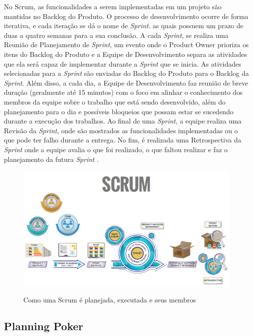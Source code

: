 No Scrum, as funcionalidades a serem implementadas em um projeto são mantidas no Backlog do Produto. O processo de desenvolvimento ocorre de forma iterativa, e cada iteração se dá o nome de \textit{Sprint}. as quais possuem um prazo de duas a quatro semanas para a sua conclusão. A cada \textit{Sprint}, se realiza uma Reunião de Planejamento de \textit{Sprint}, um evento onde o Product Owner prioriza os itens do Backlog do Produto e a Equipe de Desenvolvimento separa as atividades que ela será capaz de implementar durante a \textit{Sprint} que se inicia. As atividades selecionadas para a \textit{Sprint} são enviadas do Backlog do Produto para o Backlog da \textit{Sprint}. Além disso, a cada dia, a Equipe de Desenvolvimento faz reunião de breve duração (geralmente até 15 minutos) com o foco em alinhar o conhecimento dos membros da equipe sobre o trabalho que está sendo desenvolvido, além do planejamento para o dia e possíveis bloqueios que possam estar se sucedendo durante a execução dos trabalhos. Ao final de uma \textit{Sprint}, a equipe realiza uma Revisão da \textit{Sprint}, onde são mostrados as funcionalidades implementadas ou o que pode ter falho durante a entrega. No fim, é realizada uma Retrospectiva da \textit{Sprint} onde a equipe avalia o que foi realizado, o que faltou realizar e faz o planejamento da futura \textit{Sprint} \cite{Scrum}.

\begin{figure}
    \centering
    \includegraphics{img/Imagem Scrum Primer.png}
    \caption{Como uma Scrum é planejada, executada e seus membros} \cite{primer}
    \label{fig:scrum}
\end{figure}

\subsection{Planning Poker}

